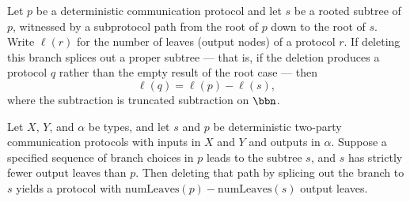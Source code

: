 \begin{lemma}
\label{CommunicationComplexity.Deterministic.Protocol.deletePath_numLeaves_of_some}
\leanok
{}
Let $p$ be a deterministic communication protocol and let $s$ be a rooted subtree of
$p$, witnessed by a subprotocol path from the root of $p$ down to the root of $s$. Write
$\ell(r)$ for the number of leaves (output nodes) of a protocol $r$. If deleting this
branch splices out a proper subtree — that is, if the deletion produces a protocol $q$
rather than the empty result of the root case — then \[ \ell(q) = \ell(p) - \ell(s), \]
where the subtraction is truncated subtraction on $\bbn$.
\end{lemma}

\begin{lemma}
\label{CommunicationComplexity.Deterministic.Protocol.prunePath_numLeaves_of_lt}
\leanok
{}
Let $X$, $Y$, and $\alpha$ be types, and let $s$ and $p$ be deterministic two-party
communication protocols with inputs in $X$ and $Y$ and outputs in $\alpha$. Suppose a
specified sequence of branch choices in $p$ leads to the subtree $s$, and $s$ has
strictly fewer output leaves than $p$. Then deleting that path by splicing out the
branch to $s$ yields a protocol with $\mathrm{numLeaves}(p)-\mathrm{numLeaves}(s)$
output leaves.
\end{lemma}

